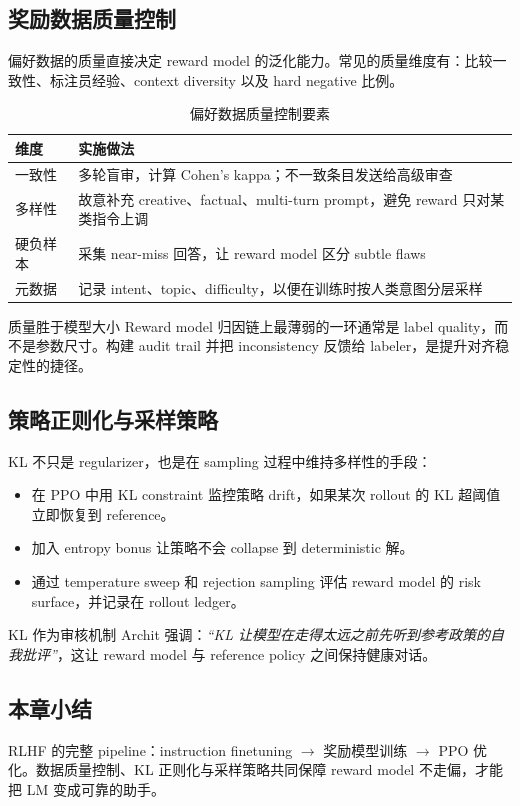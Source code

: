 \subsection{奖励数据质量控制}

偏好数据的质量直接决定 reward model 的泛化能力。常见的质量维度有：比较一致性、标注员经验、context diversity 以及 hard negative 比例。

\begin{table}[H]
\centering
\begin{tabular}{p{} p{}}
\toprule
维度 & 实施做法 \\
\midrule
一致性 & 多轮盲审，计算 Cohen's kappa；不一致条目发送给高级审查 \\
多样性 & 故意补充 creative、factual、multi-turn prompt，避免 reward 只对某类指令上调 \\
硬负样本 & 采集 near-miss 回答，让 reward model 区分 subtle flaws \\
元数据 & 记录 intent、topic、difficulty，以便在训练时按人类意图分层采样 \\
\bottomrule
\end{tabular}
\caption{偏好数据质量控制要素}
\end{table}

\begin{knowledgebox}{质量胜于模型大小}
Reward model 归因链上最薄弱的一环通常是 label quality，而不是参数尺寸。构建 audit trail 并把 inconsistency 反馈给 labeler，是提升对齐稳定性的捷径。
\end{knowledgebox}

\subsection{策略正则化与采样策略}

KL 不只是 regularizer，也是在 sampling 过程中维持多样性的手段：
\begin{itemize}
    \item 在 PPO 中用 KL constraint 监控策略 drift，如果某次 rollout 的 KL 超阈值立即恢复到 reference。
    \item 加入 entropy bonus 让策略不会 collapse 到 deterministic 解。
    \item 通过 temperature sweep 和 rejection sampling 评估 reward model 的 risk surface，并记录在 rollout ledger。
\end{itemize}

\begin{importantbox}{KL 作为审核机制}
Archit 强调：\textit{``KL 让模型在走得太远之前先听到参考政策的自我批评''}，这让 reward model 与 reference policy 之间保持健康对话。
\end{importantbox}

\subsection{本章小结}

RLHF 的完整 pipeline：instruction finetuning $\to$ 奖励模型训练 $\to$ PPO 优化。数据质量控制、KL 正则化与采样策略共同保障 reward model 不走偏，才能把 LM 变成可靠的助手。


